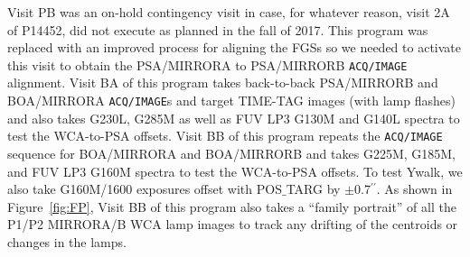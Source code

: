 \documentclass[12pt]{reportj}
\def\arcsec{\hbox{$^{\prime\prime}$}}
\newcommand{\pid}[1]{{\rm P}#1}
\newcommand{\tacq}[1]{\texttt{ACQ/#1}}
\begin{document}
Visit PB was an on-hold contingency visit in case, for whatever reason, visit 2A of \pid{14452}, did not execute as planned in the fall of 2017. This program was replaced with an improved process for aligning the FGSs so we needed to activate this visit to obtain the PSA/MIRRORA to PSA/MIRRORB \tacq{IMAGE} alignment.
Visit BA of this program takes back-to-back PSA/MIRRORB and BOA/MIRRORA \tacq{IMAGE}s and target TIME-TAG images (with lamp flashes) and also takes G230L, G285M as well as FUV LP3 G130M and G140L spectra to test the WCA-to-PSA offsets.
Visit BB of this program repeats the \tacq{IMAGE} sequence for BOA/MIRRORA and BOA/MIRRORB and takes G225M, G185M, and FUV LP3 G160M spectra to test the WCA-to-PSA offsets. To test Ywalk, we also take G160M/1600 exposures offset with {POS$\_$TARG} by $\pm$0.7\arcsec.
As shown in Figure~\ref{fig:FP}, Visit BB of this program also takes a ``family portrait'' of all the P1/P2 MIRRORA/B WCA lamp images to track any drifting of the centroids or changes in the lamps.
\end{document}

